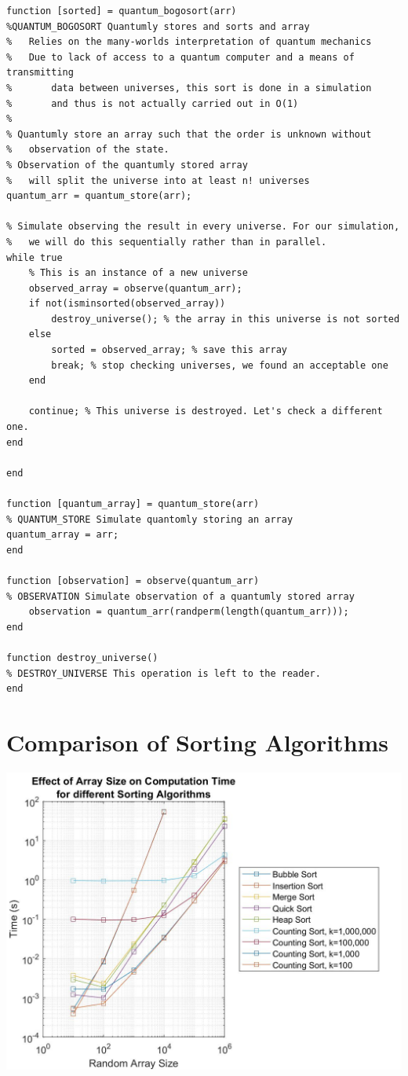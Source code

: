 \documentclass[a4paper]{article}
\begin{document}
\begin{lstlisting}
function [sorted] = quantum_bogosort(arr)
%QUANTUM_BOGOSORT Quantumly stores and sorts and array
%   Relies on the many-worlds interpretation of quantum mechanics
%   Due to lack of access to a quantum computer and a means of transmitting
%       data between universes, this sort is done in a simulation
%       and thus is not actually carried out in O(1)
%
% Quantumly store an array such that the order is unknown without
%   observation of the state.
% Observation of the quantumly stored array
%   will split the universe into at least n! universes
quantum_arr = quantum_store(arr);

% Simulate observing the result in every universe. For our simulation, 
%   we will do this sequentially rather than in parallel.
while true
    % This is an instance of a new universe
    observed_array = observe(quantum_arr);
    if not(isminsorted(observed_array))
        destroy_universe(); % the array in this universe is not sorted
    else
        sorted = observed_array; % save this array
        break; % stop checking universes, we found an acceptable one
    end
    
    continue; % This universe is destroyed. Let's check a different one.
end

end

function [quantum_array] = quantum_store(arr)
% QUANTUM_STORE Simulate quantomly storing an array
quantum_array = arr;
end

function [observation] = observe(quantum_arr)
% OBSERVATION Simulate observation of a quantumly stored array
    observation = quantum_arr(randperm(length(quantum_arr)));
end

function destroy_universe()
% DESTROY_UNIVERSE This operation is left to the reader.
end

\end{lstlisting}

\pagebreak
\section{Comparison of Sorting Algorithms}

\includegraphics[scale=0.4]{SortTimes}
\end{document}
